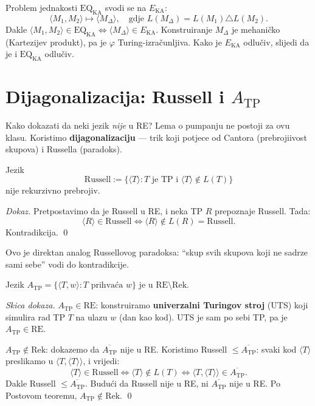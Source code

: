 \begin{primjer}
Problem jednakosti $\mathrm{EQ}_\mathrm{KA}$ svodi se na $E_\mathrm{KA}$:
\[
  \langle M_1, M_2 \rangle \mapsto \langle M_\Delta \rangle,
  \quad \text{gdje } L(M_\Delta) = L(M_1) \triangle L(M_2).
\]
Dakle $\langle M_1, M_2 \rangle \in \mathrm{EQ}_\mathrm{KA}
\iff \langle M_\Delta \rangle \in E_\mathrm{KA}$.
Konstruiranje $M_\Delta$ je mehaničko (Kartezijev produkt),
pa je $\varphi$ Turing-izračunljiva. Kako je $E_\mathrm{KA}$ odlučiv,
slijedi da je i $\mathrm{EQ}_\mathrm{KA}$ odlučiv. \checkmark
\end{primjer}

\section{Dijagonalizacija: Russell i $A_\mathrm{TP}$}

Kako dokazati da neki jezik \emph{nije} u RE? Lema o pumpanju
ne postoji za ovu klasu. Koristimo \textbf{dijagonalizaciju} --- trik
koji potjece od Cantora (prebrojiivost skupova) i Russella (paradoks).

\begin{propozicija}
Jezik
\[
  \mathrm{Russell} := \{\langle T \rangle : T \text{ je TP i } \langle T \rangle \notin L(T)\}
\]
nije rekurzivno prebrojiv.
\end{propozicija}

\textit{Dokaz.}
Pretpostavimo da je Russell u RE, i neka TP $R$ prepoznaje Russell.
Tada:
\[
  \langle R \rangle \in \mathrm{Russell}
  \iff \langle R \rangle \notin L(R) = \mathrm{Russell}.
\]
Kontradikcija. \qed

Ovo je direktan analog Russellovog paradoksa: ``skup svih skupova
koji ne sadrze sami sebe'' vodi do kontradikcije.

\begin{propozicija}
Jezik $A_\mathrm{TP} = \{\langle T, w \rangle : T \text{ prihvaća } w\}$
je u $\mathrm{RE} \setminus \mathrm{Rek}$.
\end{propozicija}

\textit{Skica dokaza.}
$A_\mathrm{TP} \in \mathrm{RE}$: konstruiramo \textbf{univerzalni Turingov stroj}
(UTS) koji simulira rad TP $T$ na ulazu $w$ (dan kao kod).
UTS je sam po sebi TP, pa je $A_\mathrm{TP} \in \mathrm{RE}$.

$A_\mathrm{TP} \notin \mathrm{Rek}$: dokazemo da $\overline{A_\mathrm{TP}}$ nije u RE.
Koristimo Russell $\leq \overline{A_\mathrm{TP}}$: svaki kod $\langle T \rangle$
preslikamo u $\langle T, \langle T \rangle \rangle$, i vrijedi:
\[
  \langle T \rangle \in \mathrm{Russell}
  \iff \langle T \rangle \notin L(T)
  \iff \langle T, \langle T \rangle \rangle \in \overline{A_\mathrm{TP}}.
\]
Dakle Russell $\leq \overline{A_\mathrm{TP}}$. Budući da Russell nije u RE,
ni $\overline{A_\mathrm{TP}}$ nije u RE. Po Postovom teoremu,
$A_\mathrm{TP} \notin \mathrm{Rek}$. \qed

